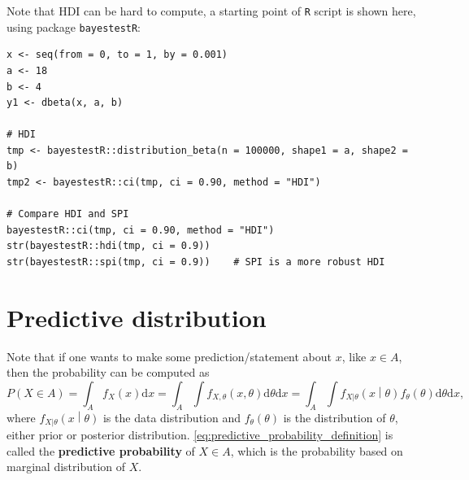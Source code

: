 \documentclass[a4paper,12pt]{article}
\begin{document}
Note that HDI can be hard to compute, a starting point of \texttt{R} script is shown here, using package
\texttt{bayestestR}:
\begin{verbatim}
x <- seq(from = 0, to = 1, by = 0.001)
a <- 18
b <- 4
y1 <- dbeta(x, a, b)

# HDI
tmp <- bayestestR::distribution_beta(n = 100000, shape1 = a, shape2 = b)
tmp2 <- bayestestR::ci(tmp, ci = 0.90, method = "HDI")

# Compare HDI and SPI
bayestestR::ci(tmp, ci = 0.90, method = "HDI")
str(bayestestR::hdi(tmp, ci = 0.9))
str(bayestestR::spi(tmp, ci = 0.9))    # SPI is a more robust HDI
\end{verbatim}



\section{Predictive distribution}
\label{sec:pred-distr}

Note that if one wants to make some prediction/statement about $x$, like $x\in A$, then the probability can be computed as
\begin{equation}
  \label{eq:predictive_probability_definition}
    P\left(X \in A\right) = \int_A f_X\left(x\right)\mathrm{d}x
  = \int_A\int f_{X, \theta}\left(x, \theta\right)\mathrm{d}\theta\mathrm{d}x
  = \int_A\int f_{X|\theta}\left(x\middle|\theta\right)f_\theta\left(\theta\right)\mathrm{d}\theta\mathrm{d}x
  ,
\end{equation}
where $f_{X|\theta}\left(x\middle|\theta\right)$ is the data distribution and $f_\theta\left(\theta\right)$ is the distribution of $\theta$, either prior or posterior distribution. \eqref{eq:predictive_probability_definition} is called the \textbf{predictive probability} of $X\in A$, which is the probability based on marginal distribution of $X$.







\end{document}
